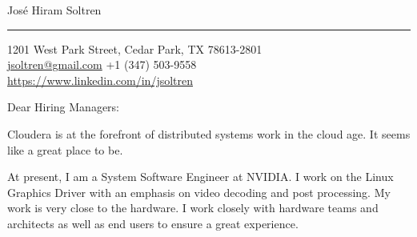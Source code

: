 \documentclass{letter} %
\begin{document}
\signature{Jos\'e Hiram Soltren}           %
\longindentation=0pt                       %
\let\raggedleft\raggedright                %


\begin{letter}{
}

\begin{flushleft}
{\LARGE\sffamily Jos\'e Hiram Soltren}
\end{flushleft}
\medskip\hrule height 1pt
\begin{flushright}
\hfill 1201 West Park Street, Cedar Park, TX 78613-2801 \\
\hfill {} \href{mailto:jsoltren@gmail.com}{jsoltren@gmail.com}
        +1 (347) 503-9558 \\
\hfill {} \url{https://www.linkedin.com/in/jsoltren}
\end{flushright}
\vfill %


\opening{Dear Hiring Managers:}


Cloudera is at the forefront of distributed systems work in the cloud age.
It seems like a great place to be.


At present, I am a System Software Engineer at NVIDIA. I work on the Linux
Graphics Driver with an emphasis on video decoding and post processing. My
work is very close to the hardware. I work closely with hardware teams and
architects as well as end users to ensure a great experience.


\end{letter}
\end{document}
